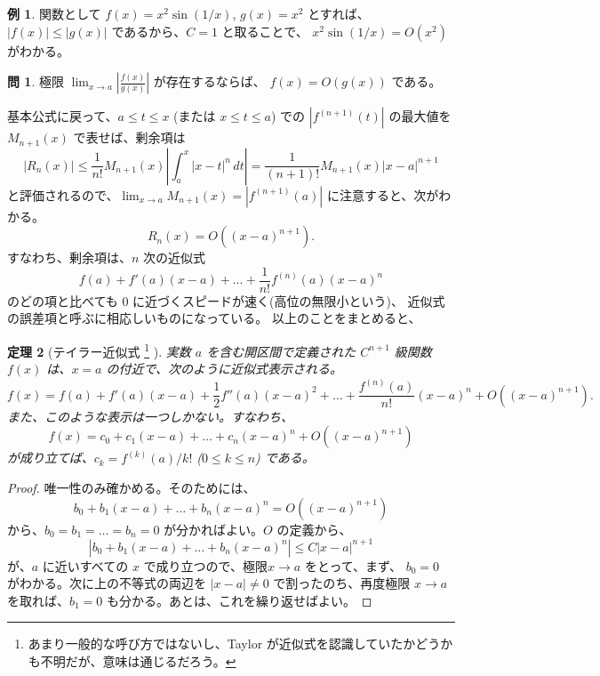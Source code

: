 \documentclass[a4paper]{jsarticle}
\newtheorem{Theorem}{定理}[section]
\theoremstyle{definition}
\newtheorem{Example}[Theorem]{例}
\newtheorem{Exercise}{問}%
\theoremstyle{remark}
\begin{document}
\begin{Example} 
関数として $f(x) = x^2\sin(1/x)$, $g(x) = x^2$ とすれば、$|f(x)| \leq |g(x)|$ であるから、$C=1$ と取ることで、
$x^2\sin(1/x) = O(x^2)$ がわかる。 
\end{Example}

\begin{Exercise}
極限 $\lim_{x \to a} \left| \frac{f(x)}{g(x)} \right|$ が存在するならば、
$f(x) = O(g(x))$ である。
\end{Exercise}

基本公式に戻って、$a \leq t \leq x$ (または $x \leq t \leq a$) での $|f^{(n+1)}(t)|$ の最大値を 
$M_{n+1}(x)$ で表せば、剰余項は
\[
|R_n(x)|
\leq 
\frac{1}{n!} M_{n+1}(x) \left| 
\int_a^x 
|x-t|^n\, dt 
\right| 
= \frac{1}{(n+1)!} M_{n+1}(x) |x-a|^{n+1}
\]
と評価されるので、$\lim_{x \to a} M_{n+1}(x) = |f^{(n+1)}(a)|$ に注意すると、次がわかる。
\[
R_n(x) = O((x-a)^{n+1}).  
\]
すなわち、剰余項は、$n$ 次の近似式
\[
f(a) + f'(a)(x-a) + \dots + \frac{1}{n!} f^{(n)}(a) (x-a)^n 
\]
のどの項と比べても $0$ に近づくスピードが速く(高位の無限小という)、
近似式の誤差項と呼ぶに相応しいものになっている。
以上のことをまとめると、

\begin{Theorem}[テイラー近似式
\footnote{
あまり一般的な呼び方ではないし、Taylor が近似式を認識していたかどうかも不明だが、意味は通じるだろう。
} 
]
実数 $a$ を含む開区間で定義された $C^{n+1}$ 級関数 $f(x)$ は、$x=a$ の付近で、次のように近似式表示される。
\[
f(x) = f(a) + f'(a)(x-a) + \frac{1}{2} f''(a)(x-a)^2 + \dots + \frac{f^{(n)}(a)}{n!} (x-a)^n 
+ O((x-a)^{n+1}). 
\]
また、このような表示は一つしかない。すなわち、
\[
f(x) = c_0 + c_1(x-a) + \dots + c_n(x-a)^n + O((x-a)^{n+1})
\]
が成り立てば、$c_k = f^{(k)}(a)/k!$ ($0 \leq k \leq n$) である。 
\end{Theorem}

\begin{proof}
唯一性のみ確かめる。そのためには、
\[
b_0 + b_1(x-a) + \dots + b_n(x-a)^n = O((x-a)^{n+1})
\]
から、$b_0 = b_1 = \dots = b_n = 0$ が分かればよい。$O$ の定義から、
\[
|b_0 + b_1(x-a) + \dots + b_n(x-a)^n| \leq C |x-a|^{n+1}
\]
が、$a$ に近いすべての $x$ で成り立つので、極限$x \to a$ をとって、まず、
$b_0 = 0$ がわかる。次に上の不等式の両辺を $|x-a| \not= 0$ で割ったのち、再度極限 
$x\to a$ を取れば、$b_1 = 0$ も分かる。あとは、これを繰り返せばよい。
\end{proof}
\end{document}
